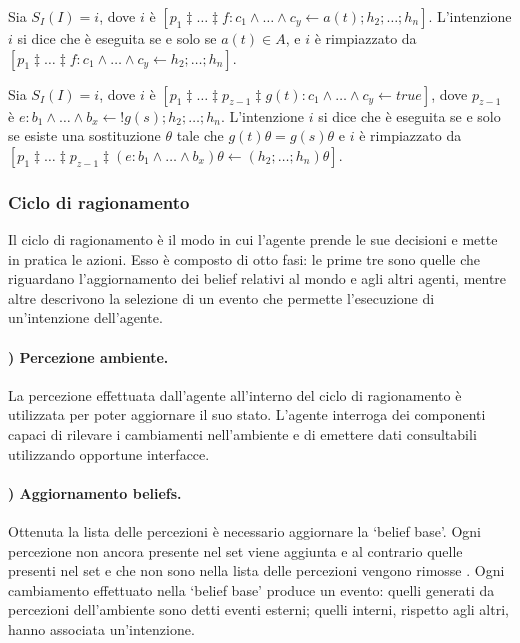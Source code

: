 \smallskip
\begin{defn}
Sia $S_I(I) = i$, dove $i$ è $[p_1 \ddagger \ldots \ddagger f : c_1 \land \ldots \land c_y \leftarrow a(t); h_2; \ldots; h_n]$. L'intenzione $i$ si dice che è eseguita se e solo se $a(t) \in A$, e $i$ è rimpiazzato da $[p_1 \ddagger \ldots \ddagger f : c_1 \land \ldots \land c_y \leftarrow h_2; \ldots; h_n]$.
\end{defn}

\smallskip
\begin{defn}
Sia $S_I(I) = i$, dove $i$ è $[p_1 \ddagger \ldots \ddagger p_{z-1} \ddagger g(t) : c_1 \land \ldots \land c_y \leftarrow true]$, dove $p_{z-1}$ è $e : b_1 \land \ldots \land b_x \leftarrow !g(s); h_2; \ldots; h_n$. L'intenzione $i$ si dice che è eseguita  se e solo se esiste una sostituzione $\theta$ tale che $g(t)\theta = g(s)\theta$ e $i$ è rimpiazzato da $[p_1 \ddagger \ldots \ddagger p_{z-1} \ddagger (e : b_1 \land \ldots \land b_x)\theta \leftarrow (h_2; \ldots; h_n) \theta]$.
\end{defn}

\subsubsection{Ciclo di ragionamento}\label{ssctn:cicloRagionamentoAgentSpeak}
Il ciclo di ragionamento è il modo in cui l'agente prende le sue decisioni e mette in pratica le azioni. Esso è composto di otto fasi: le prime tre sono quelle che riguardano l'aggiornamento dei belief relativi al mondo e agli altri agenti, mentre altre descrivono la selezione di un evento che permette l'esecuzione di un'intenzione dell'agente.

\setcounter{reasoningCycleCounter}{0}

\paragraph{) Percezione ambiente.}
La percezione effettuata dall'agente all'interno del ciclo di ragionamento è utilizzata per poter aggiornare il suo stato. L'agente interroga dei componenti capaci di rilevare i cambiamenti nell'ambiente \cite{JasonAgentSpeak} e di emettere dati consultabili utilizzando opportune interfacce.

\paragraph{) Aggiornamento beliefs.}
Ottenuta la lista delle percezioni è necessario aggiornare la `belief base'. Ogni percezione non ancora presente nel set viene aggiunta e al contrario quelle presenti nel set e che non sono nella lista delle percezioni vengono rimosse \cite{JasonAgentSpeak}.
Ogni cambiamento effettuato nella `belief base' produce un evento: quelli generati da percezioni dell'ambiente sono detti eventi esterni; quelli interni, rispetto agli altri, hanno associata un'intenzione.

